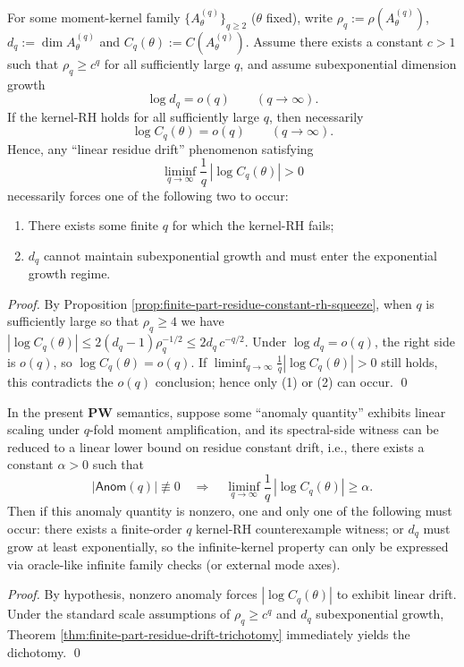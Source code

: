 \begin{theorem}\label{thm:finite-part-residue-drift-trichotomy}
For some moment-kernel family \(\{A^{(q)}_\theta\}_{q\ge 2}\) (\(\theta\) fixed), write
\(\rho_q:=\rho(A^{(q)}_\theta)\), \(d_q:=\dim A^{(q)}_\theta\) and \(C_q(\theta):=C(A^{(q)}_\theta)\).
Assume there exists a constant \(c>1\) such that \(\rho_q\ge c^q\) for all sufficiently large \(q\), and assume subexponential dimension growth
\[
\log d_q=o(q)\qquad(q\to\infty).
\]
If the kernel-RH holds for all sufficiently large \(q\), then necessarily
\[
\log C_q(\theta)=o(q)\qquad(q\to\infty).
\]
Hence, any ``linear residue drift'' phenomenon satisfying
\[
\liminf_{q\to\infty}\frac{1}{q}\,|\log C_q(\theta)|>0
\]
necessarily forces one of the following two to occur:
\begin{enumerate}
  \item There exists some finite \(q\) for which the kernel-RH fails;
  \item \(d_q\) cannot maintain subexponential growth and must enter the exponential growth regime.
\end{enumerate}
\end{theorem}

\begin{proof}
By Proposition \ref{prop:finite-part-residue-constant-rh-squeeze}, when \(q\) is sufficiently large so that \(\rho_q\ge 4\) we have
\(
|\log C_q(\theta)|\le 2(d_q-1)\rho_q^{-1/2}
\le 2d_q\,c^{-q/2}
\).
Under \(\log d_q=o(q)\), the right side is \(o(q)\), so \(\log C_q(\theta)=o(q)\).
If \(\liminf_{q\to\infty}\frac{1}{q}|\log C_q(\theta)|>0\) still holds, this contradicts the \(o(q)\) conclusion; hence only (1) or (2) can occur. \qed
\end{proof}

\begin{corollary}\label{cor:finite-part-oracle-anomaly-equivalence}
In the present \(\mathbf{PW}\) semantics, suppose some ``anomaly quantity'' exhibits linear scaling under \(q\)-fold moment amplification, and its spectral-side witness can be reduced to a linear lower bound on residue constant drift, i.e., there exists a constant \(\alpha>0\) such that
\[
|\mathsf{Anom}(q)|\not\equiv 0
\quad\Longrightarrow\quad
\liminf_{q\to\infty}\frac{1}{q}\,|\log C_q(\theta)|\ge \alpha.
\]
Then if this anomaly quantity is nonzero, one and only one of the following must occur: there exists a finite-order \(q\) kernel-RH counterexample witness; or \(d_q\) must grow at least exponentially, so the infinite-kernel property can only be expressed via oracle-like infinite family checks (or external mode axes).
\end{corollary}

\begin{proof}
By hypothesis, nonzero anomaly forces \(|\log C_q(\theta)|\) to exhibit linear drift.
Under the standard scale assumptions of \(\rho_q\ge c^q\) and \(d_q\) subexponential growth, Theorem \ref{thm:finite-part-residue-drift-trichotomy} immediately yields the dichotomy. \qed
\end{proof}


